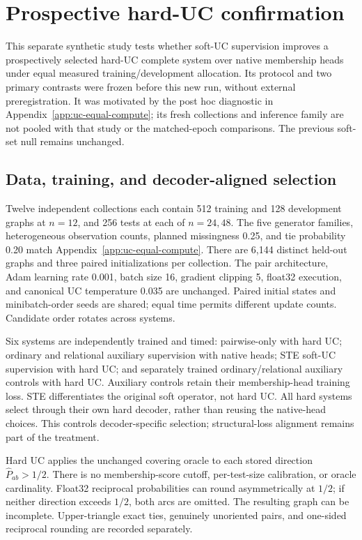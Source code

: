 \section{Prospective hard-UC confirmation}\label{app:hard-confirm}
This separate synthetic study tests whether soft-UC supervision improves a prospectively selected hard-UC complete system over native membership heads under equal measured training/development allocation. Its protocol and two primary contrasts were frozen before this new run, without external preregistration. It was motivated by the post hoc diagnostic in Appendix~\ref{app:uc-equal-compute}; its fresh collections and inference family are not pooled with that study or the matched-epoch comparisons. The previous soft-set null remains unchanged.

\subsection{Data, training, and decoder-aligned selection}
Twelve independent collections each contain 512 training and 128 development graphs at $n=12$, and 256 tests at each of $n=24,48$. The five generator families, heterogeneous observation counts, planned missingness 0.25, and tie probability 0.20 match Appendix~\ref{app:uc-equal-compute}. There are 6,144 distinct held-out graphs and three paired initializations per collection. The pair architecture, Adam learning rate 0.001, batch size 16, gradient clipping 5, float32 execution, and canonical UC temperature 0.035 are unchanged. Paired initial states and minibatch-order seeds are shared; equal time permits different update counts. Candidate order rotates across systems.

Six systems are independently trained and timed: pairwise-only with hard UC; ordinary and relational auxiliary supervision with native heads; STE soft-UC supervision with hard UC; and separately trained ordinary/relational auxiliary controls with hard UC. Auxiliary controls retain their membership-head training loss. STE differentiates the original soft operator, not hard UC. All hard systems select through their own hard decoder, rather than reusing the native-head choices. This controls decoder-specific selection; structural-loss alignment remains part of the treatment.

Hard UC applies the unchanged covering oracle to each stored direction $\widehat P_{ab}>1/2$. There is no membership-score cutoff, per-test-size calibration, or oracle cardinality. Float32 reciprocal probabilities can round asymmetrically at $1/2$; if neither direction exceeds $1/2$, both arcs are omitted. The resulting graph can be incomplete. Upper-triangle exact ties, genuinely unoriented pairs, and one-sided reciprocal rounding are recorded separately.

